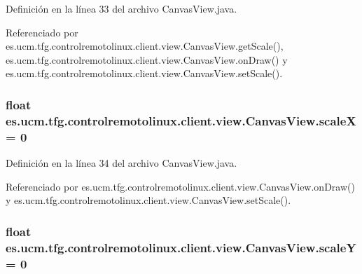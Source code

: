 Definición en la línea 33 del archivo Canvas\-View.\-java.



Referenciado por es.\-ucm.\-tfg.\-controlremotolinux.\-client.\-view.\-Canvas\-View.\-get\-Scale(), es.\-ucm.\-tfg.\-controlremotolinux.\-client.\-view.\-Canvas\-View.\-on\-Draw() y es.\-ucm.\-tfg.\-controlremotolinux.\-client.\-view.\-Canvas\-View.\-set\-Scale().

\hypertarget{classes_1_1ucm_1_1tfg_1_1controlremotolinux_1_1client_1_1view_1_1CanvasView_a1beab521f46e4d437aebcfd5ea6a463a}{
\subsubsection[{scale\-X}]{\setlength{\rightskip}{0pt plus 5cm}float es.\-ucm.\-tfg.\-controlremotolinux.\-client.\-view.\-Canvas\-View.\-scale\-X = 0\hspace{0.3cm}{\ttfamily [private]}}}\label{classes_1_1ucm_1_1tfg_1_1controlremotolinux_1_1client_1_1view_1_1CanvasView_a1beab521f46e4d437aebcfd5ea6a463a}


Definición en la línea 34 del archivo Canvas\-View.\-java.



Referenciado por es.\-ucm.\-tfg.\-controlremotolinux.\-client.\-view.\-Canvas\-View.\-on\-Draw() y es.\-ucm.\-tfg.\-controlremotolinux.\-client.\-view.\-Canvas\-View.\-set\-Scale().

\hypertarget{classes_1_1ucm_1_1tfg_1_1controlremotolinux_1_1client_1_1view_1_1CanvasView_a159269358421696f1d29dc1c46c05ad9}{
\subsubsection[{scale\-Y}]{\setlength{\rightskip}{0pt plus 5cm}float es.\-ucm.\-tfg.\-controlremotolinux.\-client.\-view.\-Canvas\-View.\-scale\-Y = 0\hspace{0.3cm}{\ttfamily [private]}}}\label{classes_1_1ucm_1_1tfg_1_1controlremotolinux_1_1client_1_1view_1_1CanvasView_a159269358421696f1d29dc1c46c05ad9}


